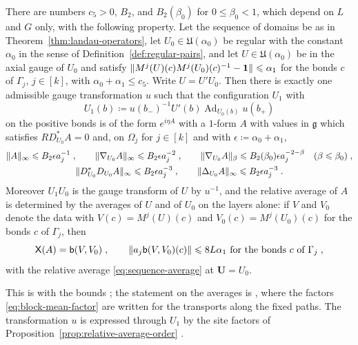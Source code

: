 \documentclass[11pt]{preprint}
\newcommand{\id}{\mathbf 1}
\newcommand{\Ad}{\operatorname{Ad}}
\DeclarePairedDelimiter{\norm}{\lVert}{\rVert}
\numberwithin{equation}{section}
\begin{document}
\begin{theorem}\label{thm:landau-gauge}
There are numbers $c_5 > 0$, $B_2$, and $B_2(\beta_0)$ for $0 \leqslant \beta_0 < 1$, which depend on $L$ and $G$ only, with the following property. Let the sequence of domains be as in Theorem~\ref{thm:landau-operators}, let $U_0 \in \mathfrak U(\alpha_0)$ be regular with the constant $\alpha_0$ in the sense of Definition~\ref{def:regular-pairs}, and let $U \in \mathfrak U(\alpha_0)$ be in the axial gauge of $U_0$ and satisfy $\norm{M^j(U)(c)M^j(U_0)(c)^{-1} - \id} \leqslant \alpha_1$ for the bonds $c$ of $\Gamma_j$, $j \in [k]$, with $\alpha_0 + \alpha_1 \leqslant c_5$. Write $U = U'U_0$. Then there is exactly one admissible gauge transformation $u$ such that the configuration $U_1$ with
\[
    U_1(b) \coloneqq u(b_-)^{-1}U'(b)\Ad_{U_0(b)}u(b_+)
\]
on the positive bonds is of the form $e^{i\eta A}$ with a $1$-form $A$ with values in $\mathfrak g$ which satisfies $RD^*_{U_0}A = 0$ and, on $\Omega_j$ for $j \in [k]$ and with $\epsilon \coloneqq \alpha_0 + \alpha_1$,
\begin{equation}\label{eq:landau-bounds}
\begin{gathered}
    \norm A_\infty\leqslant B_2\epsilon a_j^{-1}\;,
    \qquad
    \norm{\nabla_{U_0}A}_\infty \leqslant B_2\epsilon a_j^{-2}\;,
    \qquad
    \norm{\nabla_{U_0}A}_\beta \leqslant B_2(\beta_0)\epsilon a_j^{-2-\beta} \quad (\beta \leqslant \beta_0)\;,\\
    \norm{D^*_{U_0}D_{U_0}A}_\infty \leqslant B_2\epsilon a_j^{-3}\;,
    \qquad
    \norm{\Delta_{U_0}A}_\infty \leqslant B_2\epsilon a_j^{-3}\;.
\end{gathered}
\end{equation}
Moreover $U_1U_0$ is the gauge transform of $U$ by $u^{-1}$, and the relative average of $A$ is determined by the averages of $U$ and of $U_0$ on the layers alone: if $V$ and $V_0$ denote the data with $V(c) = M^j(U)(c)$ and $V_0(c) = M^j(U_0)(c)$ for the bonds $c$ of $\Gamma_j$, then
\begin{equation}\label{eq:landau-constraint}
    \mathsf X(A) = \mathsf b(V, V_0)\;,
    \qquad
    \norm{a_j\mathsf b(V, V_0)(c)} \leqslant 8L\alpha_1 \text{ for the bonds } c \text{ of } \Gamma_j\;,
\end{equation}
with the relative average \eqref{eq:sequence-average} at $\mathbf U = U_0$.
\end{theorem}

This is \cite[Theorem~2, p.~83]{BalabanREG} with the bounds \cite[(1.36)--(1.39)]{BalabanREG}; the statement on the averages is \cite[(1.30), (1.31), (1.37)]{BalabanREG}, where the factors \eqref{eq:block-mean-factor} are written for the transports along the fixed paths. The transformation $u$ is expressed through $U_1$ by the site factors of Proposition~\ref{prop:relative-average-order} \cite[(106), p.~33]{BalabanAVG}.
\end{document}
